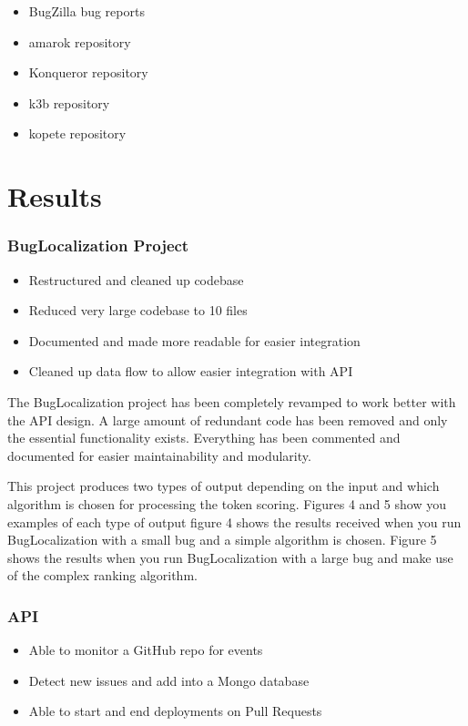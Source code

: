 \documentclass[12pt]{article}
\providecommand{\tightlist}{%
  \setlength{\itemsep}{0pt}\setlength{\parskip}{0pt}}
\begin{document}
\begin{itemize}
\tightlist
\item
  BugZilla bug reports
\item
  amarok repository
\item
  Konqueror repository
\item
  k3b repository
\item
  kopete repository
\end{itemize}

\section{Results}\label{results}

\subsubsection{BugLocalization Project}\label{buglocalization-project}

\begin{itemize}
\tightlist
\item
  Restructured and cleaned up codebase
\item
  Reduced very large codebase to 10 files
\item
  Documented and made more readable for easier integration
\item
  Cleaned up data flow to allow easier integration with API
\end{itemize}

The BugLocalization project has been completely revamped to work better
with the API design. A large amount of redundant code has been removed
and only the essential functionality exists. Everything has been
commented and documented for easier maintainability and modularity.

This project produces two types of output depending on the input and
which algorithm is chosen for processing the token scoring. Figures 4
and 5 show you examples of each type of output figure 4 shows the
results received when you run BugLocalization with a small bug and a
simple algorithm is chosen. Figure 5 shows the results when you run
BugLocalization with a large bug and make use of the complex ranking
algorithm.

\subsubsection{API}\label{api}

\begin{itemize}
\tightlist
\item
  Able to monitor a GitHub repo for events
\item
  Detect new issues and add into a Mongo database
\item
  Able to start and end deployments on Pull Requests
\end{itemize}
\end{document}
